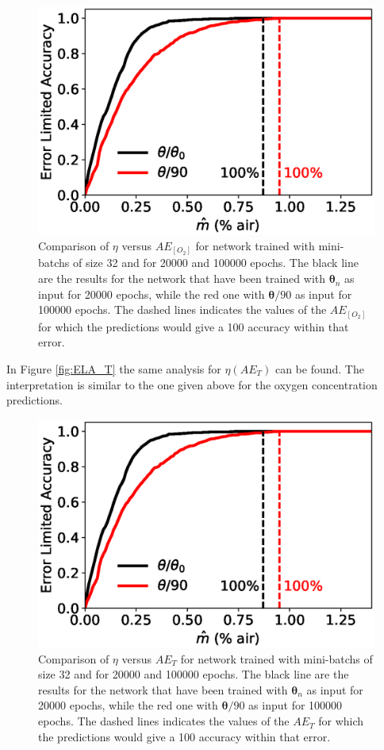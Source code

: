 \documentclass[9pt,twocolumn,twoside,pdftex]{optica}
\begin{document}
\begin{figure}[htbp]
\centering
\includegraphics[width=7 cm]{ELA_comparison.eps}
\caption{Comparison of $\eta$ versus $AE_{[O_2]}$ for network trained with mini-batchs of size 32 and for 20000 and 100000 epochs. The black line are the results for the network that have been trained with ${\pmb \theta}_n$ as input for 20000 epochs, while the red one with ${\pmb \theta} / 90$ as input for 100000 epochs. The dashed lines indicates the values of the $AE_{[O_2]}$ for which the predictions would give a 100 accuracy within that error.}
\label{fig:ELA_result_comparison}
\end{figure}

In Figure \ref{fig:ELA_T} the same analysis for $\eta(AE_T)$ can be found. The interpretation is similar to the one given above for the oxygen concentration predictions.

\begin{figure}[h!]
\centering
\includegraphics[width=7 cm]{ELA_comparison.eps}
\caption{Comparison of $\eta$ versus $AE_{T}$ for network trained with mini-batchs of size 32 and for 20000 and 100000 epochs. The black line are the results for the network that have been trained with ${\pmb \theta}_n$ as input for 20000 epochs, while the red one with ${\pmb \theta} / 90$ as input for 100000 epochs. The dashed lines indicates the values of the $AE_{T}$ for which the predictions would give a 100 accuracy within that error.}
\label{fig:ELA_result_comparison}
\end{figure}
\end{document}
